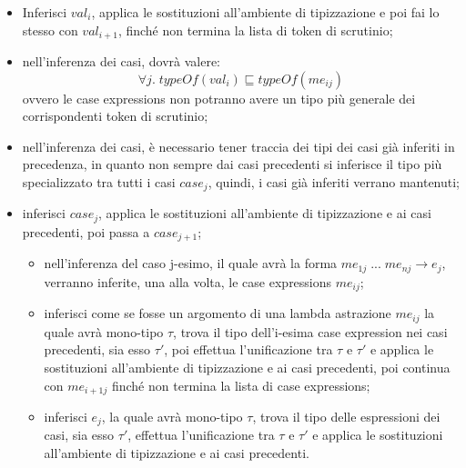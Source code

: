 \documentclass[10pt,a4paper]{article}
\begin{document}
\begin{itemize}
    \item Inferisci $ val_i $, applica le sostituzioni all'ambiente di tipizzazione e poi fai lo stesso con $ val_{i+1} $,
    finché non termina la lista di token di scrutinio;
    \item nell'inferenza dei casi, dovrà valere:
        \[ \forall j. \; typeOf(val_i) \sqsubseteq typeOf(me_{ij}) \]
    ovvero le case expressions non potranno avere un tipo più generale dei corrispondenti token di scrutinio;
    \item nell'inferenza dei casi, è necessario tener traccia dei tipi dei casi già inferiti in precedenza, in
    quanto non sempre dai casi precedenti si inferisce il tipo più specializzato tra tutti i casi $ case_j $, quindi,
    i casi già inferiti verrano mantenuti;
    \item inferisci $ case_j $, applica le sostituzioni all'ambiente di tipizzazione e ai casi precedenti, poi passa
    a $ case_{j+1} $;
    \begin{itemize}
        \item nell'inferenza del caso j-esimo, il quale avrà la forma $ me_{1j} \; ... \; me_{nj} \rightarrow e_j $,
        verranno inferite, una alla volta, le case expressions $ me_{ij} $;
        \item inferisci come se fosse un argomento di una lambda astrazione $ me_{ij} $ la quale avrà mono-tipo $ \tau $,
        trova il tipo dell'i-esima case expression nei casi precedenti, sia esso $ \tau' $, poi effettua
        l'unificazione tra $ \tau $ e $ \tau' $ e applica le sostituzioni
        all'ambiente di tipizzazione e ai casi precedenti, poi continua con $ me_{i+1j} $ finché non termina la lista di
        case expressions;
        \item inferisci $ e_j $, la quale avrà mono-tipo $ \tau $, trova il tipo delle espressioni dei casi, sia esso
        $ \tau' $, effettua l'unificazione tra $ \tau $ e $ \tau' $ e applica le sostituzioni all'ambiente di tipizzazione
        e ai casi precedenti.
    \end{itemize}
\end{itemize}
\end{document}
